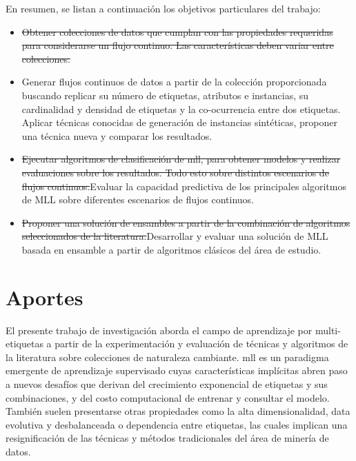 En resumen, se listan a continuación los objetivos particulares del trabajo:

\begin{itemize}

	\item \st{Obtener colecciones de datos que cumplan con las propiedades
		      requeridas para considerarse un flujo continuo. Las características
		      deben variar entre colecciones.}

	\item Generar flujos continuos de datos a partir de la colección
	      proporcionada buscando replicar su número de etiquetas, atributos e
	      instancias, su cardinalidad y densidad de etiquetas y la co-ocurrencia
	      entre dos etiquetas. Aplicar técnicas conocidas de generación de
	      instancias sintéticas, proponer una técnica nueva y comparar los
	      resultados.

	\item \st{Ejecutar algoritmos de clasificación de \acrshort{mll}, para
		      obtener modelos y realizar evaluaciones sobre los resultados. Todo esto
		      sobre distintos escenarios de flujos continuos.}Evaluar la capacidad
	      predictiva de los principales algoritmos de MLL sobre diferentes escenarios
	      de flujos continuos.

	\item \st{Proponer una solución de ensambles a partir de la combinación de
		      algoritmos seleccionados de la literatura.}Desarrollar y evaluar una
	      solución de MLL basada en ensamble a partir de algoritmos clásicos del
	      área de estudio.

\end{itemize}


\section{Aportes}

El presente  trabajo de investigación aborda el campo de aprendizaje por
multi-etiquetas a partir de la experimentación y evaluación de técnicas y
algoritmos de la literatura sobre colecciones de naturaleza cambiante.
\acrshort{mll} es un paradigma emergente de aprendizaje supervisado cuyas
características implícitas abren paso a nuevos desafíos que derivan del
crecimiento exponencial de etiquetas y sus combinaciones, y del costo
computacional de entrenar y consultar el modelo. También suelen presentarse
otras propiedades como la alta dimensionalidad, data evolutiva y desbalanceada o
dependencia entre etiquetas, las cuales implican una resignificación de las
técnicas y métodos tradicionales del área de minería de datos.

